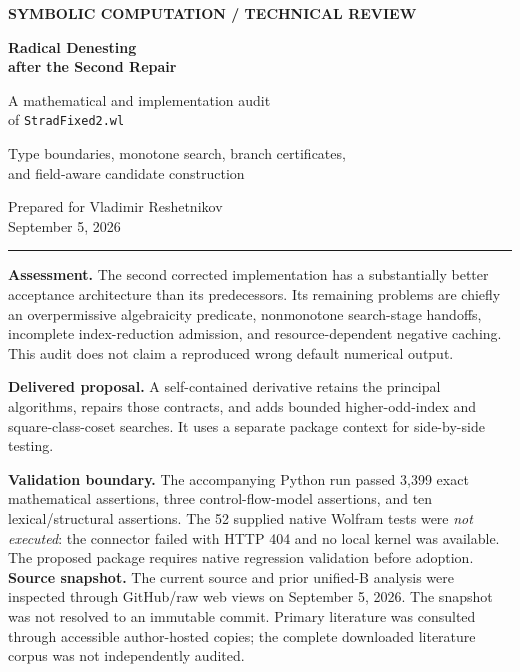 \documentclass[11pt,letterpaper]{article}
\numberwithin{equation}{section}
\theoremstyle{definition}\newtheorem{definition}[theorem]{Definition}
\theoremstyle{remark}\newtheorem{remark}[theorem]{Remark}
\newcommand{\code}[1]{\texttt{\detokenize{#1}}}
\begin{document}
\begin{titlepage}
\thispagestyle{empty}
{\small\sffamily\bfseries\color{ink} SYMBOLIC COMPUTATION \quad / \quad TECHNICAL REVIEW}\par
\vspace{0.45in}
{\Huge\bfseries Radical Denesting\\[7pt] after the Second Repair\par}
\vspace{0.2in}
{\LARGE A mathematical and implementation audit\\of \texttt{StradFixed2.wl}\par}
\vspace{0.28in}
{\large Type boundaries, monotone search, branch certificates,\\and field-aware candidate construction\par}
\vspace{0.35in}
{\large Prepared for Vladimir Reshetnikov\\September 5, 2026\par}
\vspace{0.25in}\noindent\textcolor{ink}{\rule{\textwidth}{1pt}}
\vspace{0.12in}
\noindent\textbf{Assessment.} The second corrected implementation has a substantially better acceptance architecture than its predecessors. Its remaining problems are chiefly an overpermissive algebraicity predicate, nonmonotone search-stage handoffs, incomplete index-reduction admission, and resource-dependent negative caching. This audit does not claim a reproduced wrong default numerical output.
\vspace{0.15in}

\noindent\textbf{Delivered proposal.} A self-contained \code{StradFixed3.wl} derivative retains the principal algorithms, repairs those contracts, and adds bounded higher-odd-index and square-class-coset searches. It uses a separate package context for side-by-side testing.
\vspace{0.15in}

\noindent\textbf{Validation boundary.} The accompanying Python run passed 3,399 exact mathematical assertions, three control-flow-model assertions, and ten lexical/structural assertions. The 52 supplied native Wolfram tests were \emph{not executed}: the connector failed with HTTP 404 and no local kernel was available. The proposed package requires native regression validation before adoption.
\vfill
\noindent\small\textbf{Source snapshot.} The current source and prior unified-B analysis were inspected through GitHub/raw web views on September 5, 2026. The snapshot was not resolved to an immutable commit. Primary literature was consulted through accessible author-hosted copies; the complete downloaded literature corpus was not independently audited.
\end{titlepage}
\end{document}
